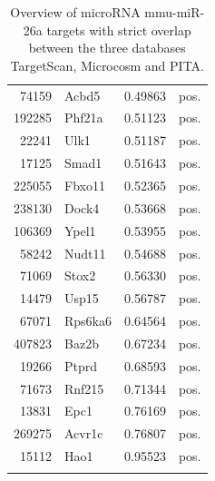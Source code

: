 \documentclass{article}
\begin{document}
\begin{Schunk}
\begin{longtable}{rlrl}
  74159 & Acbd5 & 0.49863 & pos. \\ 
  192285 & Phf21a & 0.51123 & pos. \\ 
  22241 & Ulk1 & 0.51187 & pos. \\ 
  17125 & Smad1 & 0.51643 & pos. \\ 
  225055 & Fbxo11 & 0.52365 & pos. \\ 
  238130 & Dock4 & 0.53668 & pos. \\ 
  106369 & Ypel1 & 0.53955 & pos. \\ 
  58242 & Nudt11 & 0.54688 & pos. \\ 
  71069 & Stox2 & 0.56330 & pos. \\ 
  14479 & Usp15 & 0.56787 & pos. \\ 
  67071 & Rps6ka6 & 0.64564 & pos. \\ 
  407823 & Baz2b & 0.67234 & pos. \\ 
  19266 & Ptprd & 0.68593 & pos. \\ 
  71673 & Rnf215 & 0.71344 & pos. \\ 
  13831 & Epc1 & 0.76169 & pos. \\ 
  269275 & Acvr1c & 0.76807 & pos. \\ 
  15112 & Hao1 & 0.95523 & pos. \\ 
   \hline
\hline
\caption{Overview of microRNA mmu-miR-26a targets with strict overlap between the three databases TargetScan, Microcosm and PITA.}
\end{longtable}\end{Schunk}
\end{document}
